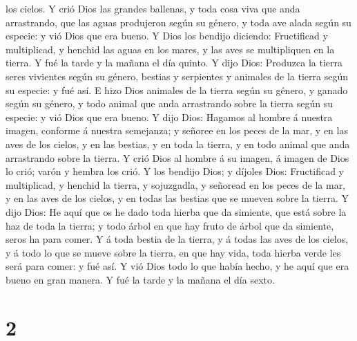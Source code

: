 los cielos.  Y crió Dios las grandes ballenas, y toda
cosa viva que anda arrastrando, que las aguas produjeron según su
género, y toda ave alada según su especie: y vió Dios que era bueno.
 Y Dios los bendijo diciendo: Fructificad y multiplicad,
y henchid las aguas en los mares, y las aves se multipliquen en la
tierra.  Y fué la tarde y la mañana el día quinto.
 Y dijo Dios: Produzca la tierra seres vivientes según su
género, bestias y serpientes y animales de la tierra según su especie: y
fué así.  E hizo Dios animales de la tierra según su
género, y ganado según su género, y todo animal que anda arrastrando
sobre la tierra según su especie: y vió Dios que era bueno.
 Y dijo Dios: Hagamos al hombre á nuestra imagen,
conforme á nuestra semejanza; y señoree en los peces de la mar, y en las
aves de los cielos, y en las bestias, y en toda la tierra, y en todo
animal que anda arrastrando sobre la tierra.  Y crió Dios
al hombre á su imagen, á imagen de Dios lo crió; varón y hembra los
crió.  Y los bendijo Dios; y díjoles Dios: Fructificad y
multiplicad, y henchid la tierra, y sojuzgadla, y señoread en los peces
de la mar, y en las aves de los cielos, y en todas las bestias que se
mueven sobre la tierra.  Y dijo Dios: He aquí que os he
dado toda hierba que da simiente, que está sobre la haz de toda la
tierra; y todo árbol en que hay fruto de árbol que da simiente, seros ha
para comer.  Y á toda bestia de la tierra, y á todas las
aves de los cielos, y á todo lo que se mueve sobre la tierra, en que hay
vida, toda hierba verde les será para comer: y fué así. 
Y vió Dios todo lo que había hecho, y he aquí que era bueno en gran
manera. Y fué la tarde y la mañana el día sexto.

\hypertarget{section-1}{%
\section{2}\label{section-1}}

